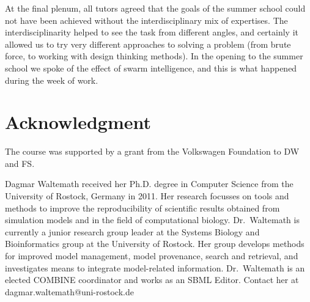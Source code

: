\documentclass[journal,transmag]{IEEEtran}
\begin{document}
At the final plenum, all tutors agreed that the goals of the summer school could not have been achieved without the interdisciplinary mix of expertises. 
The interdisciplinarity helped to see the task from different angles, and certainly it allowed us to try very different approaches to solving a problem (from brute force, to working with design thinking methods). 
In the opening to the summer school we spoke of the effect of swarm intelligence, and this is what happened during the week of work.

\section*{Acknowledgment}
The course was supported by a grant from the Volkswagen Foundation to DW and FS. 

\ifCLASSOPTIONcaptionsoff
  \newpage
\fi




% 

\begin{IEEEbiography}{Dagmar Waltemath}
received her Ph.D. degree in Computer Science from the University of Rostock, Germany in 2011. 
Her research focusses on tools and methods to improve the reproducibility of scientific results obtained from simulation models and in the field of computational biology. 
Dr.~Waltemath is currently a junior research group leader at the Systems Biology and Bioinformatics group at the University of Rostock. 
Her group develops methods for improved model management, model provenance, search and retrieval, and investigates means to integrate model-related information.  
Dr.~Waltemath is an elected COMBINE coordinator and works as an SBML Editor. 
Contact her at dagmar.waltemath@uni-rostock.de
\end{IEEEbiography}
\end{document}
